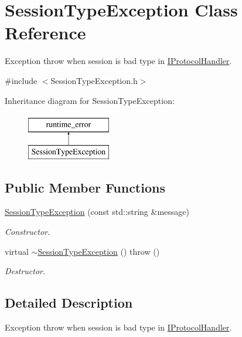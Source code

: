 \hypertarget{class_session_type_exception}{\section{Session\-Type\-Exception Class Reference}
\label{class_session_type_exception}
}


Exception throw when session is bad type in \hyperlink{class_i_protocol_handler}{I\-Protocol\-Handler}.  




{\ttfamily \#include $<$Session\-Type\-Exception.\-h$>$}

Inheritance diagram for Session\-Type\-Exception\-:\begin{figure}[H]
\begin{center}
\leavevmode
\includegraphics[height=2.000000cm]{class_session_type_exception}
\end{center}
\end{figure}
\subsection*{Public Member Functions}
\begin{DoxyCompactItemize}
\item 
\hyperlink{class_session_type_exception_a429f65a53bd0ab62d21b9134e84bbb06}{Session\-Type\-Exception} (const std\-::string \&message)
\begin{DoxyCompactList}\small\item\em Constructor. \end{DoxyCompactList}\item 
\hypertarget{class_session_type_exception_a38db7a00d650a4619f23aa572547ef05}{virtual \hyperlink{class_session_type_exception_a38db7a00d650a4619f23aa572547ef05}{$\sim$\-Session\-Type\-Exception} ()  throw ()}\label{class_session_type_exception_a38db7a00d650a4619f23aa572547ef05}

\begin{DoxyCompactList}\small\item\em Destructor. \end{DoxyCompactList}\end{DoxyCompactItemize}


\subsection{Detailed Description}
Exception throw when session is bad type in \hyperlink{class_i_protocol_handler}{I\-Protocol\-Handler}. 

